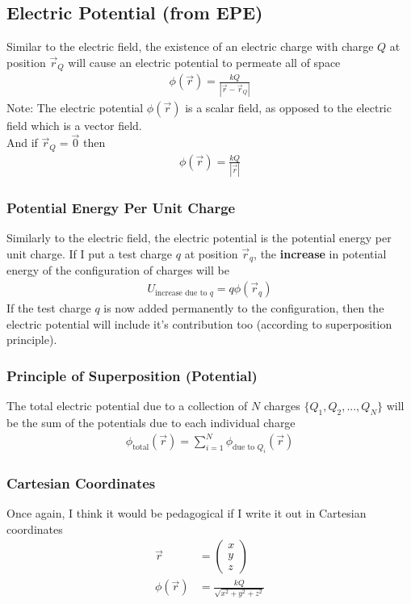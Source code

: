 \documentclass{article}
\begin{document}
\subsection{Electric Potential (from EPE)}
Similar to the electric field, the existence of an electric charge with charge $Q$ at position $\vec{r}_Q$ will cause an electric potential to permeate all of space
\begin{align}
    \phi(\vec{r}) = \frac{kQ}{|\vec{r} - \vec{r}_Q|}
\end{align}
Note: The electric potential $\phi(\vec{r})$ is a scalar field, as opposed to the electric field which is a vector field.\\[10pt]
And if $\vec{r}_Q = \vec{0}$ then
\begin{align}
    \phi(\vec{r}) = \frac{kQ}{|\vec{r}|}
\end{align}
\subsubsection{Potential Energy Per Unit Charge}
Similarly to the electric field, the electric potential is the potential energy per unit charge. If I put a test charge $q$ at position $\vec{r}_q$, the \textbf{increase} in potential energy of the configuration of charges will be
\begin{align}
    U_{\text{increase due to }q} = q\phi(\vec{r}_q) 
\end{align}
If the test charge $q$ is now added permanently to the configuration, then the electric potential will include it's contribution too (according to superposition principle).
\subsubsection{Principle of Superposition (Potential)}
The total electric potential due to a collection of $N$ charges $\{Q_1, Q_2, ..., Q_N\}$ will be the sum of the potentials due to each individual charge
\begin{align}
    \phi_{\text{total}}(\vec{r}) = \sum_{i=1}^N \phi_{\text{due to }Q_i}(\vec{r}) 
\end{align}
\subsubsection{Cartesian Coordinates}
Once again, I think it would be pedagogical if I write it out in Cartesian coordinates
\begin{align}
    \vec{r} &= \left(\begin{array}{c}
         x \\
         y \\
         z 
    \end{array}\right) \\
    \phi(\vec{r}) &= \frac{kQ}{\sqrt{x^2 + y^2 + z^2}}
\end{align}
\end{document}
